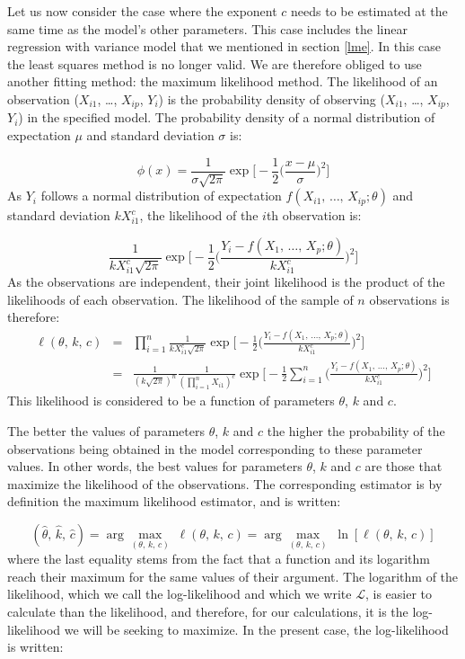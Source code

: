 Let us now consider the case where the exponent $c$ needs to be estimated at the same time as the model's other parameters. This case includes the linear regression with variance model that we mentioned in section \ref{lme}. In this case the least squares method is no longer valid. We are therefore obliged to use another fitting method: the maximum likelihood method. The likelihood of an observation ($X_{i1}$,
\ldots, $X_{ip}$, $Y_i$) is the probability density of observing ($X_{i1}$, \ldots, $X_{ip}$, $Y_i$) in the specified model. The probability density of a normal distribution of expectation $\mu$ and standard deviation $\sigma$ is:

\[
\phi(x)=\frac{1}{\sigma\sqrt{2\pi}}\exp\bigg[-\frac{1}{2}\bigg(
\frac{x-\mu}{\sigma}\bigg)^2\bigg]
\]
As $Y_i$ follows a normal distribution of expectation $f(X_{i1},\,\ldots,\,X_{ip};\theta)$ and standard deviation $kX_{i1}^c$, the likelihood of the $i$th observation is:

\[
\frac{1}{kX_{i1}^c\sqrt{2\pi}}\exp\bigg[-\frac{1}{2}\bigg(
\frac{Y_i-f(X_1,\,\ldots,\,X_p;\theta)}{kX_{i1}^c}\bigg)^2\bigg]
\]
As the observations are independent, their joint likelihood is the product of the likelihoods of each observation. The likelihood of the sample of $n$ observations is therefore:
\begin{eqnarray}
\ell(\theta,\,k,\,c) &=& \prod_{i=1}^n
\frac{1}{kX_{i1}^c\sqrt{2\pi}}\exp\bigg[-\frac{1}{2}\bigg(
\frac{Y_i-f(X_1,\,\ldots,\,X_p;\theta)}{kX_{i1}^c}\bigg)^2\bigg]
\label{vrais}
\\ &=& \frac{1}{(k\sqrt{2\pi})^n}\frac{1}{(\prod_{i=1}^nX_{i1})^c}
\exp\bigg[-\frac{1}{2}\sum_{i=1}^n\bigg(
\frac{Y_i-f(X_1,\,\ldots,\,X_p;\theta)}{kX_{i1}^c}\bigg)^2\bigg]
\nonumber
\end{eqnarray}
This likelihood is considered to be a function of parameters $\theta$, $k$ and $c$.

The better the values of parameters $\theta$, $k$ and $c$ the higher the probability of the observations being obtained in the model corresponding to these parameter values. In other words, the best values for parameters $\theta$, $k$ and $c$ are those that maximize the likelihood of the observations. The corresponding estimator is by definition the maximum likelihood estimator, and is written:

\[
(\hat{\theta},\,\hat{k},\,\hat{c})=\arg\max_{(\theta,\,k,\,c)}\;
\ell(\theta,\,k,\,c)=\arg\max_{(\theta,\,k,\,c)}\;
\ln[\ell(\theta,\,k,\,c)]
\]
where the last equality stems from the fact that a function and its logarithm reach their maximum for the same values of their argument. The logarithm of the likelihood, which we call the log-likelihood and which we write $\mathcal{L}$, is easier to calculate than the likelihood, and therefore, for our calculations, it is the log-likelihood we will be seeking to maximize. In the present case, the log-likelihood is written:

